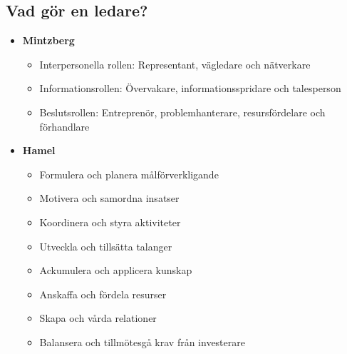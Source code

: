 \begin{multicols}{2}
\subsection{Vad gör en ledare?}
\begin{itemize}
    \item \textbf{Mintzberg}
    \begin{itemize}
        \item Interpersonella rollen: \newline
        Representant, vägledare och nätverkare
        \item Informationsrollen: \newline
        Övervakare, informationsspridare och talesperson
        \item Beslutsrollen: \newline
        Entreprenör, problemhanterare, resursfördelare och förhandlare
    \end{itemize}
    \item \textbf{Hamel}
    \begin{itemize}
        \item Formulera och planera målförverkligande
        \item Motivera och samordna insatser
        \item Koordinera och styra aktiviteter
        \item Utveckla och tillsätta talanger
        \item Ackumulera och applicera kunskap
        \item Anskaffa och fördela resurser
        \item Skapa och vårda relationer
        \item Balansera och tillmötesgå krav från investerare
    \end{itemize}
\end{itemize}


\end{multicols}
